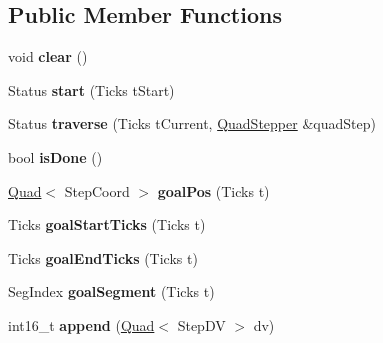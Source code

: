 \subsection*{Public Member Functions}
\begin{DoxyCompactItemize}
\item 
\hypertarget{classfirestep_1_1_stroke_a12294d036abe4ae3139d595657afcb06}{void {\bfseries clear} ()}\label{classfirestep_1_1_stroke_a12294d036abe4ae3139d595657afcb06}

\item 
\hypertarget{classfirestep_1_1_stroke_ae9e2089a39ba9c71074f8bf4bfeef07a}{Status {\bfseries start} (Ticks t\+Start)}\label{classfirestep_1_1_stroke_ae9e2089a39ba9c71074f8bf4bfeef07a}

\item 
\hypertarget{classfirestep_1_1_stroke_a9c59dbd44a6a8a1ed0e68a4ed33eaed4}{Status {\bfseries traverse} (Ticks t\+Current, \hyperlink{classfirestep_1_1_quad_stepper}{Quad\+Stepper} \&quad\+Step)}\label{classfirestep_1_1_stroke_a9c59dbd44a6a8a1ed0e68a4ed33eaed4}

\item 
\hypertarget{classfirestep_1_1_stroke_aecf277d0443b4bf91f01889389cbaa59}{bool {\bfseries is\+Done} ()}\label{classfirestep_1_1_stroke_aecf277d0443b4bf91f01889389cbaa59}

\item 
\hypertarget{classfirestep_1_1_stroke_a9c968ddcdbf730ea88c48f7da5aa3197}{\hyperlink{classfirestep_1_1_quad}{Quad}$<$ Step\+Coord $>$ {\bfseries goal\+Pos} (Ticks t)}\label{classfirestep_1_1_stroke_a9c968ddcdbf730ea88c48f7da5aa3197}

\item 
\hypertarget{classfirestep_1_1_stroke_ab08c024119e225fd8b216e849260c90a}{Ticks {\bfseries goal\+Start\+Ticks} (Ticks t)}\label{classfirestep_1_1_stroke_ab08c024119e225fd8b216e849260c90a}

\item 
\hypertarget{classfirestep_1_1_stroke_ab0d238e9d9c06370275f5b6d145d7b92}{Ticks {\bfseries goal\+End\+Ticks} (Ticks t)}\label{classfirestep_1_1_stroke_ab0d238e9d9c06370275f5b6d145d7b92}

\item 
\hypertarget{classfirestep_1_1_stroke_a5c2e64edcac39b1c909a38299d01e668}{Seg\+Index {\bfseries goal\+Segment} (Ticks t)}\label{classfirestep_1_1_stroke_a5c2e64edcac39b1c909a38299d01e668}

\item 
\hypertarget{classfirestep_1_1_stroke_a52c1c232d148553b16832a107fad0ffe}{int16\+\_\+t {\bfseries append} (\hyperlink{classfirestep_1_1_quad}{Quad}$<$ Step\+D\+V $>$ dv)}\label{classfirestep_1_1_stroke_a52c1c232d148553b16832a107fad0ffe}


\end{DoxyCompactItemize}
